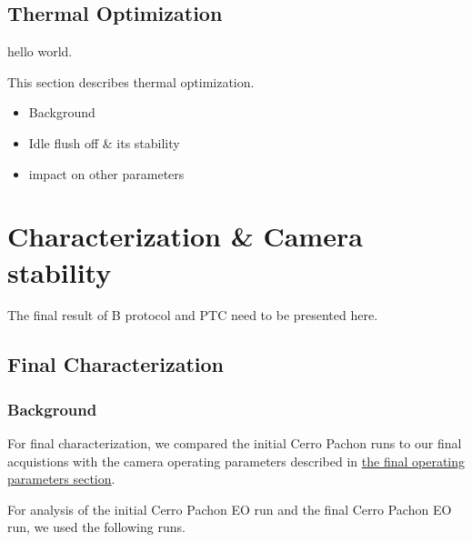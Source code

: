 \subsection{Thermal Optimization}\label{thermal-optimization}

hello world.

This section describes thermal optimization.

\begin{itemize}
\tightlist
\item
  Background
\item
  Idle flush off \& it\textquotesingle s stability
\item
  impact on other parameters
\end{itemize}

\section{Characterization \& Camera
stability}\label{characterization-camera-stability}

The final result of B protocol and PTC need to be presented here.

\subsection{Final Characterization}\label{final-characterization-1}

\subsubsection{Background}\label{background-2}

For final characterization, we compared the initial Cerro Pachon runs to
our final acquistions with the camera operating parameters described in
\href{https://sitcomtn-148.lsst.io/v/main/index.html\#run-7-final-operating-parameters}{the
final operating parameters section}.

For analysis of the initial Cerro Pachon EO run and the final Cerro
Pachon EO run, we used the following runs.

